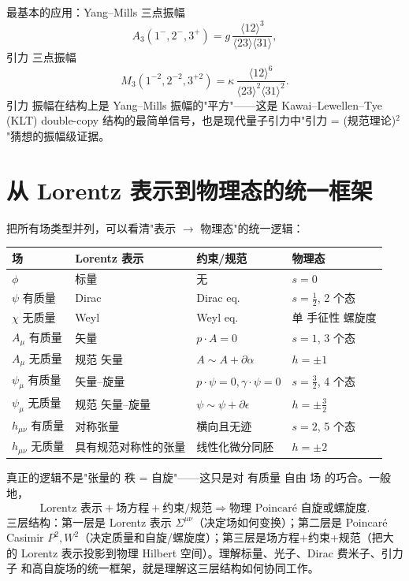 最基本的应用：Yang--Mills 三点振幅
\begin{equation}
A_3(1^-,2^-,3^+)=g\,\frac{\langle 12\rangle^3}{\langle 23\rangle\langle 31\rangle},
\end{equation}
引力 三点振幅
\begin{equation}
M_3(1^{-2},2^{-2},3^{+2})=\kappa\,\frac{\langle 12\rangle^6}{\langle 23\rangle^2\langle 31\rangle^2}.
\end{equation}
引力 振幅在结构上是 Yang--Mills 振幅的"平方"——这是 Kawai--Lewellen--Tye (KLT) double-copy 结构的最简单信号，也是现代量子引力中"引力 = (规范理论)$^2$"猜想的振幅级证据。

\section{从 Lorentz 表示到物理态的统一框架}

把所有场类型并列，可以看清"表示 $\to$ 物理态"的统一逻辑：

\begin{center}
\begin{tabular}{llll}
\hline
场 & Lorentz 表示 & 约束/规范 & 物理态 \\
\hline
$\phi$ & 标量 & 无 & $s=0$ \\
$\psi$ 有质量 & Dirac & Dirac eq. & $s=\frac{1}{2}$, 2 个态 \\
$\chi$ 无质量 & Weyl & Weyl eq. & 单 手征性 螺旋度 \\
$A_\mu$ 有质量 & 矢量 & $p\cdot A=0$ & $s=1$, 3 个态 \\
$A_\mu$ 无质量 & 规范 矢量 & $A\sim A+\partial\alpha$ & $h=\pm 1$ \\
$\psi_\mu$ 有质量 & 矢量--旋量 & $p\cdot\psi=0,\gamma\cdot\psi=0$ & $s=\frac{3}{2}$, 4 个态 \\
$\psi_\mu$ 无质量 & 规范 矢量--旋量 & $\psi\sim\psi+\partial\epsilon$ & $h=\pm\frac{3}{2}$ \\
$h_{\mu\nu}$ 有质量 & 对称张量 & 横向且无迹 & $s=2$, 5 个态 \\
$h_{\mu\nu}$ 无质量 & 具有规范对称性的张量 & 线性化微分同胚 & $h=\pm 2$ \\
\hline
\end{tabular}
\end{center}

真正的逻辑不是"张量的 秩 = 自旋"——这只是对 有质量 自由 场 的巧合。一般地，
\begin{equation*}{
\text{Lorentz 表示}+\text{场方程}+\text{约束/规范}\Longrightarrow\text{物理 Poincaré 自旋或螺旋度}.
}
\end{equation*}
三层结构：第一层是 Lorentz 表示 $\Sigma^{\mu\nu}$（决定场如何变换）；第二层是 Poincaré Casimir $P^2,W^2$（决定质量和自旋/螺旋度）；第三层是场方程+约束+规范（把大的 Lorentz 表示投影到物理 Hilbert 空间）。理解标量、光子、Dirac 费米子、引力子 和高自旋场的统一框架，就是理解这三层结构如何协同工作。

